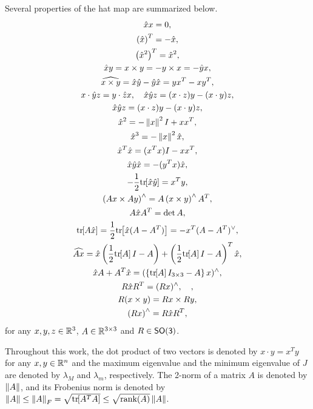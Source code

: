 Several properties of the hat map are summarized below.
\begin{gather}
    \hat{x} x = 0, \\
    \left( \hat x \right) ^T = - \hat x,\label{eq:hatxT} \\
    \left( \hat{x}^2 \right)^T = \hat x ^2, \\
    \hat x y = x\times y = - y\times x = - \hat y x, \label{eqn:cross_product}\\
    \widehat{x\times y} = \hat x \hat y -\hat y \hat x = yx^T-xy^T,\label{eq:hatxy}\\
    x\cdot \hat y z = y\cdot \hat z x,\quad \hat x\hat y z = (x\cdot z) y - (x\cdot y ) z\label{eqn:STP},\\
    \hat x\hat y z = (x\cdot z) y - (x\cdot y ) z,\label{eqn:VTP}\\
    \hat{x}^2 = - \left\| x \right\|^2 I + x x^T, \\
    \hat{x}^3 = -\left\| x \right\|^2 \hat x, \\
    \hat x^T \hat x = (x^T x) I - x x^T, \label{eq:xTx} \\
    \hat x \hat y \hat x=-(y^Tx)\hat x,\\
    -\frac{1}{2}\mathrm{tr}\negthickspace\left[ \hat x \hat y \right] = x^T y,\\
    \left( A x \times A y \right)^\wedge = A\left( x \times y \right)^\wedge A^T, \\
    A \hat x A^T = \det{A}, \\
    \mathrm{tr}\negthickspace\left[ A\hat x  \right]=\frac{1}{2}\mathrm{tr}\negthickspace\left[ \hat x (A-A^T) \right]=-x^T (A-A^T)^\vee,\label{eqn:hat1}\\
    \widehat{Ax} = \hat x \left( \frac{1}{2}\mathrm{tr}\negthickspace\left[ A \right]I-A \right) + \left( \frac{1}{2}\mathrm{tr}\negthickspace\left[ A \right]I-A \right)^T \hat x,\\
    \hat x  A+A^T\hat x=(\left\{ \mathrm{tr}\negthickspace\left[ A \right]I_{3\times 3}-A \right\}x)^{\wedge}, \label{eqn:xAAx} \\
    R\hat x R^T = (Rx)^\wedge,\quad , \\
    R(x\times y) = Rx\times Ry\label{eqn:RxR} , \\
    \left( R x \right)^\wedge = R \hat x R^T, \\
\end{gather}
for any $x,y,z\in\mathbb{R}^{3}$, $A\in\mathbb{R}^{3\times 3}$ and $R\in\mathsf{SO(3)}$. 

Throughout this work, the dot product of two vectors is denoted by $x\cdot y = x^T y$ for any $x,y\in\mathbb{R}^n$ and the maximum eigenvalue and the minimum eigenvalue of $J$ are denoted by $\lambda_M$ and $\lambda_m$, respectively. 
The 2-norm of a matrix \( A \) is denoted by \( \left\| A \right\| \), and its Frobenius norm is denoted by \( \left\| A \right\| \leq \left\| A \right\|_F = \sqrt{\mathrm{tr}\negthickspace\left[ A^T A \right]} \leq \sqrt{\text{rank}(A)} \left\| A \right\| \).
